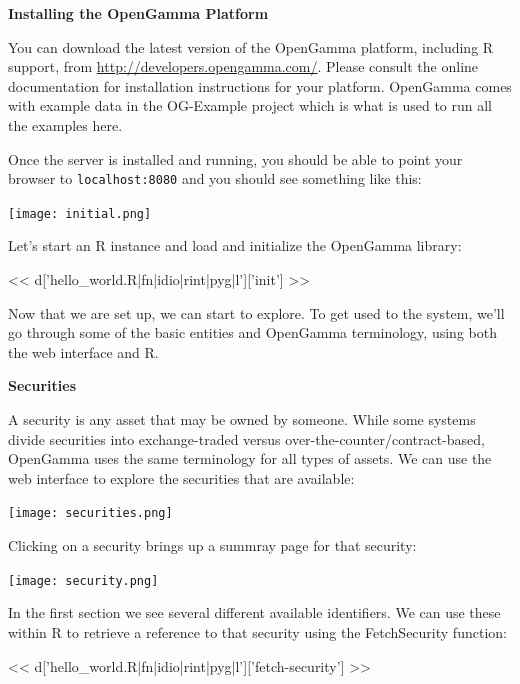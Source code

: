 \documentclass[custom, plainsections]{sciposter}
\begin{document}
\begin{multicols*}{2}
\small

\textbf{Installing the OpenGamma Platform}

\vspace{0.5cm}

You can download the latest version of the OpenGamma platform, including R support, from \url{http://developers.opengamma.com/}. Please consult the online documentation for installation instructions for your platform. OpenGamma comes with example data in the OG-Example project which is what is used to run all the examples here.

Once the server is installed and running, you should be able to point your browser to \verb|localhost:8080| and you should see something like this:

\vspace{0.5cm}
\texttt{[image: initial.png]}
\vspace{0.5cm}

Let's start an R instance and load and initialize the OpenGamma library:

<< d['hello_world.R|fn|idio|rint|pyg|l']['init'] >>

Now that we are set up, we can start to explore. To get used to the system, we'll go through some of the basic entities and OpenGamma terminology, using both the web interface and R.

\textbf{Securities}
\vspace{0.5cm}

A security is any asset that may be owned by someone. While some systems divide securities into exchange-traded versus over-the-counter/contract-based, OpenGamma uses the same terminology for all types of assets. We can use the web interface to explore the securities that are available:

\vspace{0.5cm}
\texttt{[image: securities.png]}
\vspace{0.5cm}

Clicking on a security brings up a summray page for that security:

\vspace{0.5cm}
\texttt{[image: security.png]}
\vspace{0.5cm}

In the first section we see several different available identifiers. We can use these within R to retrieve a reference to that security using the FetchSecurity function:

<< d['hello_world.R|fn|idio|rint|pyg|l']['fetch-security'] >>


\end{multicols*}
\end{document}
